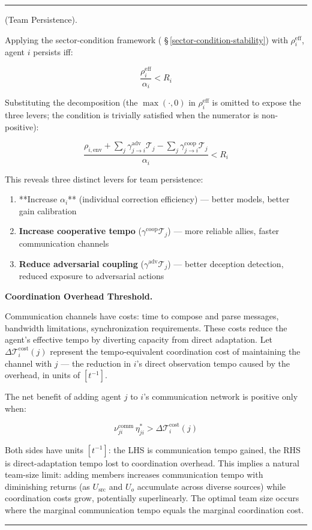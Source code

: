 \documentclass[11pt,oneside]{article}
\newcounter{claim}[section]
\renewcommand{\theclaim}{\thesection.\arabic{claim}}
\newenvironment{segment}[2]{%
  \refstepcounter{claim}%
  \bigskip\noindent\hrule\smallskip
  \noindent{\bfseries #1~\theclaim}\enskip(#2).\par\smallskip
  \noindent\ignorespaces
}{%
  \par\smallskip\noindent\hrule\bigskip
}
\newenvironment{proposition}[1][]{\begin{segment}{Proposition}{#1}}{\end{segment}}
\begin{document}
\begin{proposition}[Team Persistence]

Applying the sector-condition framework ( \S\,\ref{sector-condition-stability}) with $\rho_i^{\text{eff}}$, agent $i$ persists iff:

$$\frac{\rho_i^{\text{eff}}}{\alpha_i} < R_i$$

Substituting the decomposition (the $\max(\cdot, 0)$ in $\rho_i^{\text{eff}}$ is omitted to expose the three levers; the condition is trivially satisfied when the numerator is non-positive):

$$\frac{\rho_{i,\text{env}} + \sum_j \gamma_{j \to i}^{\text{adv}} \mathcal{T}_j - \sum_j \gamma_{j \to i}^{\text{coop}} \mathcal{T}_j}{\alpha_i} < R_i$$

This reveals three distinct levers for team persistence:

\begin{enumerate}
  \item **Increase $\alpha_i$** (individual correction efficiency) — better models, better gain calibration
  \item \textbf{Increase cooperative tempo} ($\gamma^{\text{coop}} \mathcal T_j$) — more reliable allies, faster communication channels
  \item \textbf{Reduce adversarial coupling} ($\gamma^{\text{adv}} \mathcal T_j$) — better deception detection, reduced exposure to adversarial actions
\end{enumerate}



\medskip\noindent\textbf{Coordination Overhead Threshold.}



Communication channels have costs: time to compose and parse messages, bandwidth limitations, synchronization requirements. These costs reduce the agent's effective tempo by diverting capacity from direct adaptation. Let $\Delta \mathcal T_i^{\text{cost}}(j)$ represent the tempo-equivalent coordination cost of maintaining the channel with $j$ — the reduction in $i$'s direct observation tempo caused by the overhead, in units of $[t^{-1}]$.

The net benefit of adding agent $j$ to $i$'s communication network is positive only when:

$$\nu_{ji}^{\text{comm}} \, \eta_{ji}^* > \Delta \mathcal{T}_i^{\text{cost}}(j)$$

Both sides have units $[t^{-1}]$: the LHS is communication tempo gained, the RHS is direct-adaptation tempo lost to coordination overhead. This implies a natural team-size limit: adding members increases communication tempo with diminishing returns (as $U_{\text{src}}$ and $U_o$ accumulate across diverse sources) while coordination costs grow, potentially superlinearly. The optimal team size occurs where the marginal communication tempo equals the marginal coordination cost.



\end{proposition}
\end{document}
